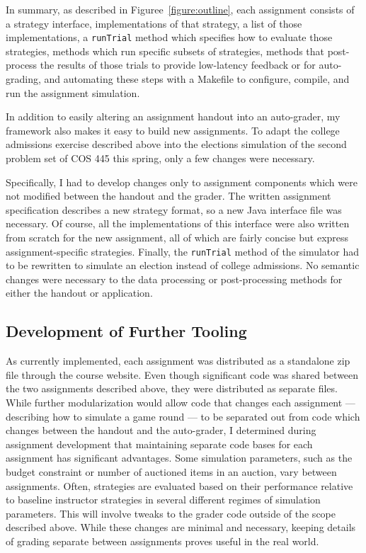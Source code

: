 \documentclass[pageno]{jpaper}
\begin{document}
In summary, as described in Figuree~\ref{figure:outline}, each assignment consists of a strategy interface, implementations of that strategy, a list of those implementations, a \texttt{runTrial} method which specifies how to evaluate those strategies, methods which run specific subsets of strategies, methods that post-process the results of those trials to provide low-latency feedback or for auto-grading, and automating these steps with a Makefile to configure, compile, and run the assignment simulation.

In addition to easily altering an assignment handout into an auto-grader, my framework also makes it easy to build new assignments.
To adapt the college admissions exercise described above into the elections simulation of the second problem set of COS 445 this spring, only a few changes were necessary.

Specifically, I had to develop changes only to assignment components which were not modified between the handout and the grader.
The written assignment specification describes a new strategy format, so a new Java interface file was necessary.
Of course, all the implementations of this interface were also written from scratch for the new assignment, all of which are fairly concise but express assignment-specific strategies.
Finally, the \texttt{runTrial} method of the simulator had to be rewritten to simulate an election instead of college admissions.
No semantic changes were necessary to the data processing or post-processing methods for either the handout or application.

\subsection*{Development of Further Tooling}
As currently implemented, each assignment was distributed as a standalone zip file through the course website.
Even though significant code was shared between the two assignments described above, they were distributed as separate files.
While further modularization would allow code that changes each assignment --- describing how to simulate a game round --- to be separated out from code which changes between the handout and the auto-grader, I determined during assignment development that maintaining separate code bases for each assignment has significant advantages.
Some simulation parameters, such as the budget constraint or number of auctioned items in an auction, vary between assignments.
Often, strategies are evaluated based on their performance relative to baseline instructor strategies in several different regimes of simulation parameters.
This will involve tweaks to the grader code outside of the scope described above.
While these changes are minimal and necessary, keeping details of grading separate between assignments proves useful in the real world.
\end{document}
